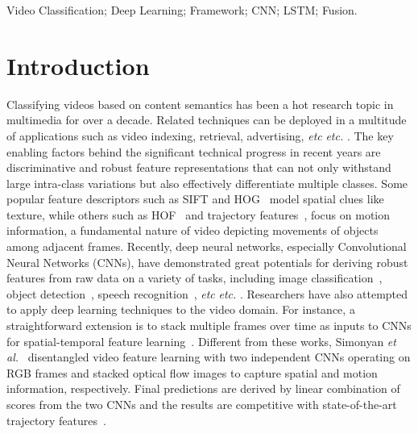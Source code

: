 \documentclass[journal]{IEEEtran}
\makeatletter
\newcommand*{\etal}{\emph{et al.}\@\xspace}
\newcommand*{\etc}{%
    \@ifnextchar{.}%
        {\emph{etc}}%
        {\emph{etc.}\@\xspace}%
}
\makeatother
\begin{document}
\begin{IEEEkeywords}
Video Classification; Deep Learning; Framework; CNN; LSTM; Fusion.
\end{IEEEkeywords}

\IEEEpeerreviewmaketitle

\section{Introduction}
Classifying videos based on content semantics has been a hot research topic in multimedia for over a decade. Related techniques can be deployed in a multitude of applications such as video indexing, retrieval, advertising, \etc. The key enabling factors behind the significant technical progress in recent years are discriminative and robust feature representations that can not only withstand large intra-class variations but also effectively differentiate multiple classes. Some popular feature descriptors such as SIFT \cite{lowe2004distinctive} and HOG~\cite{dalal2005histograms} model spatial clues like texture, while others such as HOF~\cite{dalal2006} and trajectory features~\cite{wang2013action,jiang2015super,shi2016sequential}, focus on motion information, a fundamental nature of video depicting movements of objects among adjacent frames. Recently, deep neural networks, especially Convolutional Neural Networks (CNNs), have demonstrated great potentials for deriving robust features from raw data on a variety of tasks, including image classification~\cite{krizhevsky2012imagenet}, object detection~\cite{girshick2014rcnn}, speech recognition~\cite{DBLP:conf/icassp/GravesMH13}, \etc. Researchers have also attempted to apply deep learning techniques to the video domain. For instance, a straightforward extension is to stack multiple frames over time as inputs to CNNs for spatial-temporal feature learning~\cite{KarpathyCVPR14,DBLP:conf/icml/JiXYY10,Tran2015}. Different from these works, Simonyan \etal~\cite{DBLP:conf/nips/SimonyanZ14} disentangled video feature learning with two independent CNNs operating on RGB frames and stacked optical flow images to capture spatial and motion information, respectively. Final predictions are derived by linear combination of scores from the two CNNs and the results are competitive with state-of-the-art trajectory features~\cite{wang2013action}. 
\end{document}
